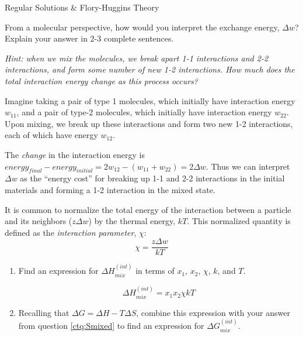 \begin{activity}{Regular Solutions \& Flory-Huggins Theory}
\begin{ctqs}
		
	\question From a molecular perspective, how would you interpret the exchange energy, $\Delta w$?  Explain your answer in 2-3 complete sentences.
	
		\emph{Hint: when we mix the molecules, we break apart 1-1 interactions and 2-2 interactions, and form some number of new 1-2 interactions.  How much does the total interaction energy change as this process occurs?}
		
		\begin{solution}[3in]
		
			Imagine taking a pair of type 1 molecules, which initially have interaction energy $w_{11}$, and a pair of type-2 molecules, which initially have interaction energy $w_{22}$.  Upon mixing, we break up these interactions and form two new 1-2 interactions, each of which have energy $w_{12}$.
			
			The \emph{change} in the interaction energy is $energy_{final} - energy_{initial} = 2w_{12} - (w_{11} + w_{22}) = 2\Delta w$.  Thus we can interpret $\Delta w$ as the ``energy cost'' for breaking up 1-1 and 2-2 interactions in the initial materials and forming a 1-2 interaction in the mixed state.
			
		\end{solution}
			

	\question It is common to normalize the total energy of the interaction  between a particle and its neighbors ($z\Delta w$) by the thermal energy, $kT$.  This normalized quantity is defined as the \emph{interaction parameter}, $\chi$:
		\begin{equation*}
			\chi = \frac{z\Delta w}{kT}
		\end{equation*}
	
		\begin{enumerate}
			\item Find an expression for $\Delta H_{mix}^{(int)}$ in terms of $x_1$, $x_2$, $\chi$, $k$, and $T$.
		
			\begin{solution}[1in]
				\begin{equation*}
					\Delta H_{mix}^{(int)} = x_1 x_2 \chi kT
				\end{equation*}
			\end{solution}

			\item Recalling that $\Delta G = \Delta H - T\Delta S$, combine this expression with your answer from question \ref{ctq:Smixed} to find an expression for $\Delta G_{mix}^{(int)}$.
			

\end{enumerate}
\end{ctqs}
\end{activity}
